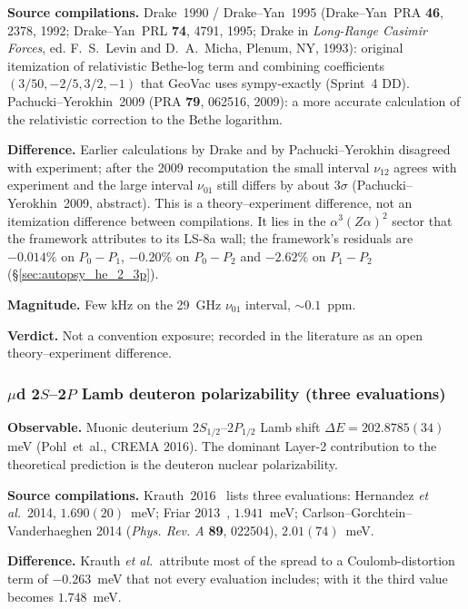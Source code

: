 \documentclass[11pt]{article}
\begin{document}
\textbf{Source compilations.}  Drake~1990 / Drake--Yan~1995
(Drake--Yan~PRA \textbf{46}, 2378, 1992; Drake--Yan~PRL \textbf{74},
4791, 1995; Drake in \emph{Long-Range Casimir Forces}, ed. F.~S.~Levin
and D.~A.~Micha, Plenum, NY, 1993): original itemization of relativistic
Bethe-log term and combining coefficients $(3/50, -2/5, 3/2, -1)$
that GeoVac uses sympy-exactly (Sprint~4 DD).
Pachucki--Yerokhin~2009 (PRA \textbf{79}, 062516, 2009): a more
accurate calculation of the relativistic correction to the Bethe
logarithm.

\textbf{Difference.}  Earlier calculations by Drake and by
Pachucki--Yerokhin disagreed with experiment; after the 2009
recomputation the small interval $\nu_{12}$ agrees with experiment and
the large interval $\nu_{01}$ still differs by about $3\sigma$
(Pachucki--Yerokhin~2009, abstract).  This is a theory--experiment
difference, not an itemization difference between compilations.  It
lies in the $\alpha^3(Z\alpha)^2$ sector that the framework attributes
to its LS-8a wall; the framework's residuals are $-0.014\%$ on
$P_0 - P_1$, $-0.20\%$ on $P_0 - P_2$ and $-2.62\%$ on $P_1 - P_2$
(\S\ref{sec:autopsy_he_2_3p}).

\textbf{Magnitude.}  Few kHz on the 29~GHz $\nu_{01}$ interval,
$\sim 0.1$~ppm.

\textbf{Verdict.}  Not a convention exposure; recorded in the literature
as an open theory--experiment difference.

\subsubsection{$\mu$d 2$S$--2$P$ Lamb deuteron polarizability
(three evaluations)}
\label{sec:conv_d_polarizability_mud_lamb}

\textbf{Observable.}  Muonic deuterium 2$S_{1/2}$--2$P_{1/2}$ Lamb
shift $\Delta E = 202.8785(34)$ meV (Pohl~et~al., CREMA 2016).
The dominant Layer-2 contribution to the theoretical prediction
is the deuteron nuclear polarizability.

\textbf{Source compilations.}  Krauth~2016~\cite{krauth2016} lists
three evaluations: Hernandez \emph{et al.}\ 2014, $1.690(20)$~meV;
Friar 2013~\cite{friar2013}, $1.941$~meV; Carlson--Gorchtein--Vanderhaeghen 2014
(\emph{Phys. Rev. A} \textbf{89}, 022504), $2.01(74)$~meV.

\textbf{Difference.}  Krauth \emph{et al.}\ attribute most of the
spread to a Coulomb-distortion term of $-0.263$~meV that not every
evaluation includes; with it the third value becomes $1.748$~meV.
\end{document}
